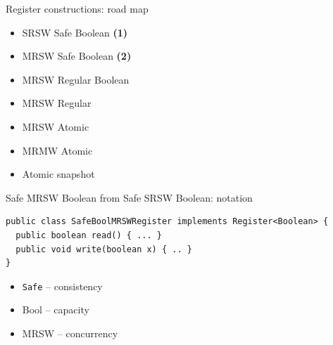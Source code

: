 \begin{frame}[noframenumbering]{Register constructions: road map}

\begin{itemize}
  \item SRSW Safe Boolean \textbf{(1)}
  \item MRSW Safe Boolean \textbf{(2)}
  \item MRSW Regular Boolean
  \item MRSW Regular
  \item MRSW Atomic
  \item MRMW Atomic
  \item Atomic snapshot
\end{itemize}

\end{frame}

\begin{frame}[t,fragile]{Safe MRSW Boolean from Safe SRSW Boolean: notation}

\begin{verbatim}
public class SafeBoolMRSWRegister implements Register<Boolean> {
  public boolean read() { ... }
  public void write(boolean x) { .. }
}
\end{verbatim}

\pause

\begin{itemize}
  \item \texttt{Safe} -- consistency
  \item Bool -- capacity
  \item MRSW -- concurrency
\end{itemize}

\end{frame}


